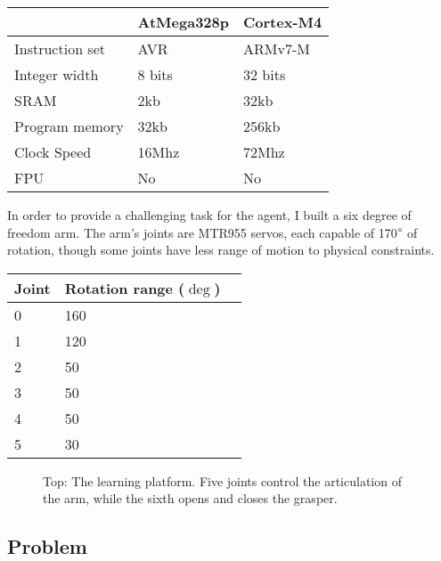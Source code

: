 \documentclass{article}
\begin{document}
\begin{center}
	\begin{tabular}{ l l l}
		& AtMega328p & Cortex-M4  \\ \midrule
		Instruction set & AVR & ARMv7-M\\
		Integer width & 8 bits & 32 bits\\
		SRAM & 2kb & 32kb\\
		Program memory & 32kb & 256kb\\
		Clock Speed & 16Mhz & 72Mhz\\ 
		FPU & No & No
		
	\end{tabular}
\end{center}

In order to provide a challenging task for the agent, I built a six degree of freedom arm. The arm's joints are MTR955 servos, each capable of 170$\degree$ of rotation, though some joints have less range of motion to physical constraints.

\begin{center}
	\begin{tabular}{ l l l}
		Joint & Rotation range ($\deg$)  \\ \midrule
		0 & 160 \\
		1 & 120 \\
		2 & 50 \\
		3 & 50 \\
		4 & 50\\ 
		5 & 30
		
	\end{tabular}
\end{center}

\begin{figure}
	\centering
	\caption{Top: The learning platform. Five joints control the articulation of the arm, while the sixth opens and closes the grasper.}
	\label{fig:platform}
\end{figure}


\subsection{Problem}
\end{document}
